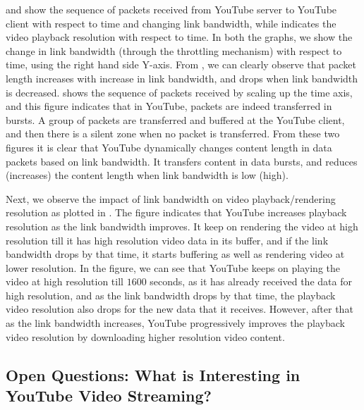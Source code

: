 \fig{\ref{fig:packet}} and \fig{\ref{fig:burst}} show the sequence of packets received from YouTube server to YouTube client with respect to time and changing link bandwidth, while \fig{\ref{fig:reso}} indicates the video playback resolution with respect to time. In both the graphs, we show the change in link bandwidth (through the throttling mechanism) with respect to time, using the right hand side Y-axis. From \fig{\ref{fig:packet}}, we can clearly observe that packet length increases with increase in link bandwidth, and drops when link bandwidth is decreased. \fig{\ref{fig:burst}} shows the sequence of packets received by scaling up the time axis, and this figure indicates that in YouTube, packets are indeed transferred in bursts. A group of packets are transferred and buffered at the YouTube client, and then there is a silent zone when no packet is transferred. From these two figures it is clear that YouTube dynamically changes content length in data packets based on link bandwidth. It transfers content in data bursts, and reduces (increases) the content length when link bandwidth is low (high). 

Next, we observe the impact of link bandwidth on video playback/rendering resolution as plotted in \fig{\ref{fig:reso}}. The figure indicates that YouTube increases playback resolution as the link bandwidth improves. It keep on rendering the video at high resolution till it has high resolution video data in its buffer, and if the link bandwidth drops by that time, it starts buffering as well as rendering video at lower resolution. In the figure, we can see that YouTube keeps on playing the video at high resolution till $1600$ seconds, as it has already received the data for high resolution, and as the link bandwidth drops by that time, the playback video resolution also drops for the new data that it receives. However, after that as the link bandwidth increases, YouTube progressively improves the playback video resolution by downloading higher resolution video content.

\subsection{Open Questions: What is Interesting in YouTube Video Streaming?}

